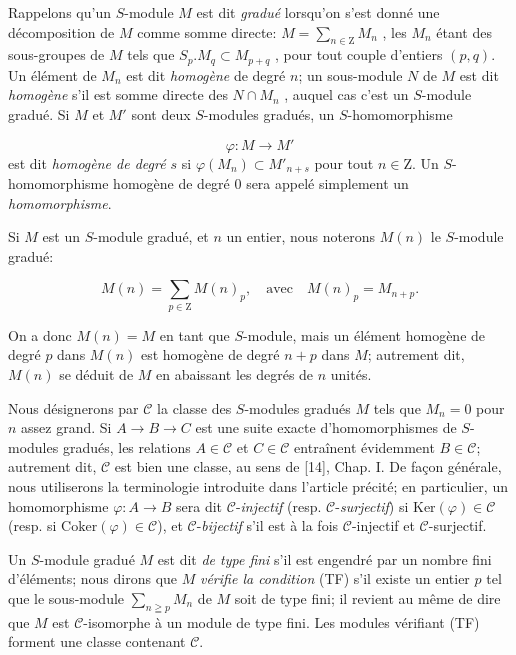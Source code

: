 Rappelons qu'un $S$-module $M$ est dit \textit{gradué} lorsqu'on s'est donné une décomposition de $M$ comme somme directe: $M = \sum_{n \in \mathrm{Z}} M_n$ , les $M_n$ étant des sous-groupes de $M$ tels que $S_p.M_q \subset M_{p+q}$ , pour tout couple d'entiers $(p, q)$. Un élément de $M_n$ est dit \textit{homogène} de degré $n$; un sous-module $N$ de $M$ est dit \textit{homogène} s'il est somme directe des $N \cap M_n$ , auquel cas c'est un $S$-module gradué. Si $M$ et $M'$ sont deux $S$-modules gradués, un $S$-homomorphisme

\begin{equation*}
\varphi : M \to M'
\end{equation*}
est dit \textit{homogène de degré $s$} si $\varphi(M_n) \subset M'_{n+s}$ pour tout $n \in \mathrm{Z}$. Un $S$-homomorphisme homogène de degré 0 sera appelé simplement un \textit{homomorphisme}.

Si $M$ est un $S$-module gradué, et $n$ un entier, nous noterons $M(n)$ le $S$-module gradué:

\begin{equation*}
M(n) = \sum_{p \in \mathrm{Z}} M(n)_p , \quad \mathrm{avec} \quad M(n)_p = M_{n+p} .
\end{equation*}


On a donc $M(n) = M$ en tant que $S$-module, mais un élément homogène de degré $p$ dans $M(n)$ est homogène de degré $n + p$ dans $M$; autrement dit, $M(n)$ se déduit de $M$ en abaissant les degrés de $n$ unités.

Nous désignerons par $\mathcal{C}$ la classe des $S$-modules gradués $M$ tels que $M_n = 0$ pour $n$ assez grand. Si $A \to B \to C$ est une suite exacte d'homomorphismes de $S$-modules gradués, les relations $A \in \mathcal{C}$ et $C \in \mathcal{C}$ entraînent évidemment $B \in \mathcal{C}$; autrement dit, $\mathcal{C}$ est bien une classe, au sens de [14], Chap. I. De façon générale, nous utiliserons la terminologie introduite dans l'article précité; en particulier, un homomorphisme $\varphi : A \to B$ sera dit $\mathcal{C}$-\textit{injectif} (resp. $\mathcal{C}$-\textit{surjectif}) si $\mathrm{Ker}(\varphi) \in \mathcal{C}$ (resp. si $\mathrm{Coker}(\varphi) \in \mathcal{C}$), et $\mathcal{C}$-\textit{bijectif} s'il est à la fois $\mathcal{C}$-injectif et $\mathcal{C}$-surjectif.

Un $S$-module gradué $M$ est dit \textit{de type fini} s'il est engendré par un nombre fini d'éléments; nous dirons que $M$ \textit{vérifie la condition} (TF) s'il existe un entier $p$ tel que le sous-module $\sum_{n \geqq p} M_n$ de $M$ soit de type fini; il revient au même de dire que $M$ est $\mathcal{C}$-isomorphe à un module de type fini. Les modules vérifiant (TF) forment une classe contenant $\mathcal{C}$.

